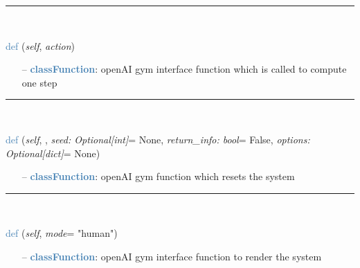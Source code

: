 \begin{itemize}[leftmargin=1.4cm]
\begin{itemize}[leftmargin=0.7cm]
\vspace{12pt}\end{itemize}
%
\noindent\rule{8cm}{0.75pt}\vspace{1pt} \\ 
\begin{flushleft}
\noindent \textcolor{steelblue}{def {\bf {}}}\label{sec:artificialIntelligence:OpenAIGymInterfaceEnv:step}
({\it self}, {\it action})
\end{flushleft}
\setlength{\itemindent}{0.7cm}
\begin{itemize}[leftmargin=0.7cm]
\item[--]\textcolor{steelblue}{\bf classFunction}: openAI gym interface function which is called to compute one step
\vspace{12pt}\end{itemize}
%
\noindent\rule{8cm}{0.75pt}\vspace{1pt} \\ 
\begin{flushleft}
\noindent \textcolor{steelblue}{def {\bf {}}}\label{sec:artificialIntelligence:OpenAIGymInterfaceEnv:reset}
({\it self}, {\it *}, {\it seed: Optional[int]}= None, {\it return\_info: bool}= False, {\it options: Optional[dict]}= None)
\end{flushleft}
\setlength{\itemindent}{0.7cm}
\begin{itemize}[leftmargin=0.7cm]
\item[--]\textcolor{steelblue}{\bf classFunction}: openAI gym function which resets the system
\vspace{12pt}\end{itemize}
%
\noindent\rule{8cm}{0.75pt}\vspace{1pt} \\ 
\begin{flushleft}
\noindent \textcolor{steelblue}{def {\bf {}}}\label{sec:artificialIntelligence:OpenAIGymInterfaceEnv:render}
({\it self}, {\it mode}= "human")
\end{flushleft}
\setlength{\itemindent}{0.7cm}
\begin{itemize}[leftmargin=0.7cm]
\item[--]\textcolor{steelblue}{\bf classFunction}: openAI gym interface function to render the system

\end{itemize}
\end{itemize}
